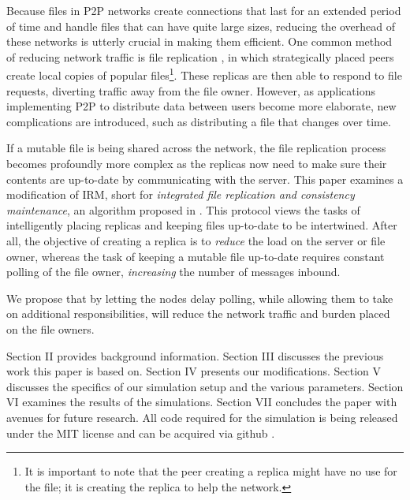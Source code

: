 \documentclass[10pt, conference, compsocconf, letterpaper]{IEEEtran} %
\begin{document}
Because files in P2P networks create connections that last for an extended period of time and handle files that can have quite large sizes, reducing the overhead of these networks is utterly crucial in making them efficient. One common method of reducing network traffic is file replication \cite{IRM}, in which strategically placed peers create local copies of popular files\footnote{It is important to note that the peer creating a replica might have no use for the file; it is creating the replica to help the network.}.  These replicas are then able to respond to file requests, diverting traffic away from the file owner.  However, as applications implementing P2P to distribute data between users become more elaborate, new complications are introduced, such as distributing a file that changes over time.  

If a mutable file is being shared across the network, the file replication process becomes profoundly more complex as the replicas  now need to make sure their contents are up-to-date \cite{IRM} by communicating with the server.  This paper examines a modification of IRM, short for \textit{integrated file replication and consistency maintenance}, an algorithm proposed in \cite{IRM}. This protocol views the tasks of intelligently placing replicas and keeping files up-to-date to be intertwined.  After all, the objective of creating a replica is to \emph{reduce} the load on the server or file owner, whereas the task of keeping a mutable file up-to-date requires constant polling of the file owner, \emph{increasing} the number of messages inbound.     

We propose that by letting the nodes delay polling, while allowing them to take on additional responsibilities, will reduce the network traffic and burden placed on the file owners.

Section II provides background information.  Section III discusses the previous work this paper is based on.  Section IV presents our modifications.  Section V discusses the specifics of our simulation setup and the various parameters.  Section VI examines the results of the simulations.  Section VII concludes the paper with avenues for future research.  All code required for the simulation is being released under the MIT license and can be acquired via github \cite{IRMLP}.  
\end{document}
